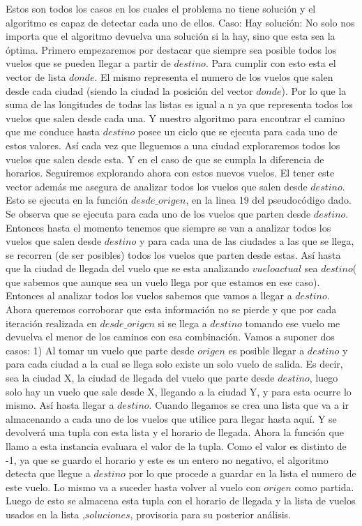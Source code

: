 \documentclass[a4paper]{article}
\begin{document}
Estos son todos los casos en los cuales el problema no tiene solución y el algoritmo es capaz de detectar cada uno de ellos.
Caso: Hay solución:
No solo nos importa que el algoritmo devuelva una solución si la hay, sino que  esta sea la óptima.
Primero empezaremos por destacar que siempre sea posible todos los vuelos que se pueden llegar a partir de $destino$. Para cumplir con esto esta el vector de lista $donde$. El mismo representa el numero de los vuelos que salen desde cada ciudad (siendo la ciudad la posición del vector $donde$). Por lo que la suma de las longitudes de todas las listas es igual a n ya que representa todos los vuelos que salen desde cada una. Y nuestro algoritmo para encontrar el camino que me conduce hasta $destino$ posee un ciclo que se  ejecuta para cada uno de estos valores. Así cada vez que lleguemos a una ciudad exploraremos todos los vuelos que salen desde esta. Y en el caso de que se cumpla la diferencia de horarios. Seguiremos explorando ahora con estos nuevos vuelos. El tener este vector además me asegura de analizar todos los vuelos que salen desde $destino$. Esto se ejecuta en la función $desde\_origen$, en la linea 19 del pseudocódigo dado. Se observa que se ejecuta para cada uno de los vuelos que parten desde $destino$. Entonces hasta el momento tenemos que siempre se van a analizar todos los vuelos que salen desde $destino$ y para cada una de las ciudades a las que se llega, se recorren (de ser posibles) todos los vuelos que parten desde estas. Así hasta que la ciudad de llegada del vuelo que se esta analizando $vuelo actual$ sea $destino$( que sabemos que aunque sea un vuelo llega por que estamos en ese caso). Entonces al analizar todos los vuelos sabemos que vamos a llegar a $destino$. Ahora queremos corroborar que esta información no se pierde y que por cada iteración realizada en $desde\_origen$ si se llega a $destino$ tomando ese vuelo me devuelva el menor de los caminos con esa combinación.
Vamos a suponer dos casos:
1) Al tomar un vuelo que parte desde $origen$ es posible llegar a $destino$ y para cada ciudad a la cual se llega solo existe un solo vuelo de salida. Es decir, sea la ciudad X, la ciudad de llegada del vuelo que parte desde $destino$, luego solo hay un vuelo que sale desde X, llegando a la ciudad Y, y para esta ocurre lo mismo. Así hasta llegar a $destino$. Cuando llegamos se crea una lista que va a ir almacenando a cada uno de los vuelos que utilice para llegar hasta aquí. Y se devolverá una tupla con esta lista y el horario de llegada. Ahora la función que llamo a esta instancia evaluara el valor de la tupla. Como el valor es distinto de -1, ya que se guardo el horario y este es un entero no negativo, el algoritmo detecta que llegue  a $destino$ por lo que procede a guardar en la lista el numero de este vuelo. Lo mismo va a suceder hasta volver al vuelo con $origen$ como partida. Luego de esto se almacena  esta tupla con el horario de llegada y la lista de vuelos usados en la lista ,$soluciones$, provisoria para su posterior análisis.
\end{document}
